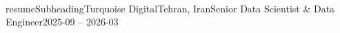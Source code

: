 \\resumeSubheading{Turquoise Digital}{Tehran, Iran}{Senior Data Scientist & Data Engineer}{2025-09 -- 2026-03}
